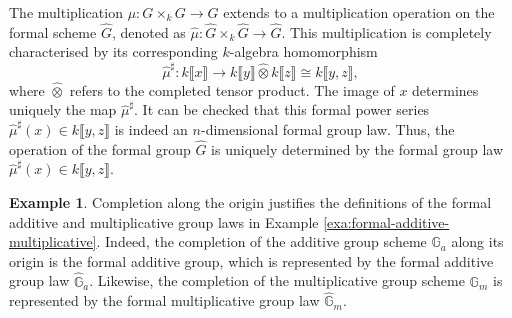 \documentclass{report}
\theoremstyle{definition}
\newtheorem{example}[equation]{Example}
\begin{document}
The multiplication $\mu:G\times_kG\rightarrow G$ extends to a multiplication operation on the formal scheme $\widehat{G}$, denoted as $\widehat{\mu}:\widehat{G}\times_k\widehat{G}\rightarrow\widehat{G}$. This multiplication is completely characterised by its corresponding $k$-algebra homomorphism
\[\widehat{\mu}^{\sharp}:k\llbracket x\rrbracket\longrightarrow k\llbracket y\rrbracket\widehat{\otimes}k\llbracket z\rrbracket\cong k\llbracket y,z\rrbracket,\]
where $\widehat{\otimes}$ refers to the completed tensor product. The image of $x$ determines uniquely the map $\widehat{\mu}^{\sharp}$. It can be checked that this formal power series $\widehat{\mu}^{\sharp}(x)\in k\llbracket y,z\rrbracket$ is indeed an $n$-dimensional formal group law. Thus, the operation of the formal group $\widehat{G}$ is uniquely determined by the formal group law $\widehat{\mu}^{\sharp}(x)\in k\llbracket y,z\rrbracket$.

\begin{example}
Completion along the origin justifies the definitions of the formal additive and multiplicative group laws in Example \ref{exa:formal-additive-multiplicative}. Indeed, the completion of the additive group scheme $\mathbb{G}_a$ along its origin is the formal additive group, which is represented by the formal additive group law $\widehat{\mathbb{G}}_a$. Likewise, the completion of the multiplicative group scheme $\mathbb{G}_m$ is represented by the formal multiplicative group law $\widehat{\mathbb{G}}_m$.
\end{example}
\end{document}
